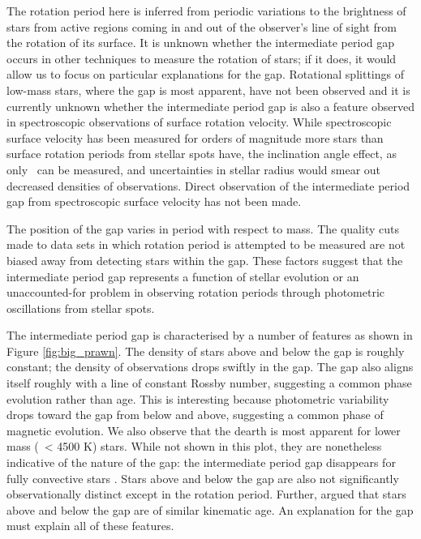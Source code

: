 The rotation period here is inferred from periodic variations to the brightness of stars from active regions coming in and out of the observer's line of sight from the rotation of its surface.
It is unknown whether the intermediate period gap occurs in other techniques to measure the rotation of stars; if it does, it would allow us to focus on particular explanations for the gap.
Rotational splittings of low-mass stars, where the gap is most apparent, have not been observed and it is currently unknown whether the intermediate period gap is also a feature observed in spectroscopic observations of surface rotation velocity.
While spectroscopic surface velocity has been measured for orders of magnitude more stars than surface rotation periods from stellar spots have, the inclination angle effect, as only \vsini\ can be measured, and uncertainties in stellar radius would smear out decreased densities of observations.
Direct observation of the intermediate period gap from spectroscopic surface velocity has not been made.

The position of the gap varies in period with respect to mass. 
The quality cuts made to data sets in which rotation period is attempted to be measured \citep[e.g. removing binaries and subgiants][]{mcquillan_rotation_2014, claytor_tess_2023} are not biased away from detecting stars within the gap.
These factors suggest that the intermediate period gap represents a function of stellar evolution or an unaccounted-for problem in observing rotation periods through photometric oscillations from stellar spots.

The intermediate period gap is characterised by a number of features as shown in Figure \ref{fig:big_prawn}.
The density of stars above and below the gap is roughly constant; the density of observations drops swiftly in the gap.
The gap also aligns itself roughly with a line of constant Rossby number, suggesting a common phase evolution rather than age.
This is interesting because photometric variability drops toward the gap from below and above, suggesting a common phase of magnetic evolution.
We also observe that the dearth is most apparent for lower mass (\teff\ < 4500 K) stars.
While not shown in this plot, they are nonetheless indicative of the nature of the gap: the intermediate period gap disappears for fully convective stars \citep{lu_bridging_2022}.
Stars above and below the gap are also not significantly observationally distinct except in the rotation period.
Further, \citet{lu_bridging_2022} argued that stars above and below the gap are of similar kinematic age.
An explanation for the gap must explain all of these features.

